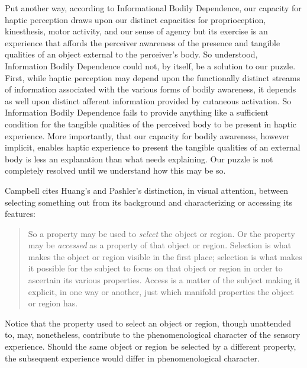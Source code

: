 Put another way, according to Informational Bodily Dependence, our capacity for haptic perception draws upon our distinct capacities for proprioception, kinesthesis, motor activity, and our sense of agency but its exercise is an experience that affords the perceiver awareness of the presence and tangible qualities of an object external to the perceiver's body. So understood, Information Bodily Dependence could not, by itself, be a solution to our puzzle. First, while haptic perception may depend upon the functionally distinct streams of information associated with the various forms of bodily awareness, it depends as well upon distinct afferent information provided by cutaneous activation. So Information Bodily Dependence fails to provide anything like a sufficient condition for the tangible qualities of the perceived body to be present in haptic experience. More importantly, that our capacity for bodily awareness, however implicit, enables haptic experience to present the tangible qualities of an external body is less an explanation than what needs explaining. Our puzzle is not completely resolved until we understand how this may be so.

Campbell cites Huang's and Pashler's \citeyearpar{Huang:2007jk} distinction, in visual attention, between selecting something out from its background and characterizing or accessing its features: 
\begin{quote}
	So a property may be used to \emph{select} the object or region. Or the property may be \emph{accessed} as a property of that object or region. Selection is what makes the object or region visible in the first place; selection is what makes it possible for the subject to focus on that object or region in order to ascertain its various properties. Access is a matter of the subject making it explicit, in one way or another, just which manifold properties the object or region has. \citep[Campbell in][54]{Campbell:2014aa}
\end{quote}
Notice that the property used to select an object or region, though unattended to, may, nonetheless, contribute to the phenomenological character of the sensory experience. Should the same object or region be selected by a different property, the subsequent experience would differ in phenomenological character. 


